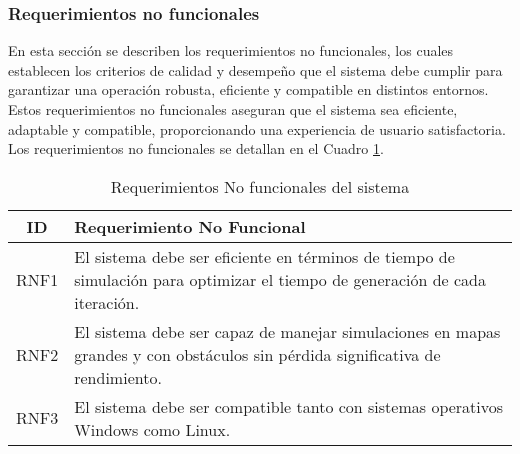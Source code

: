 \subsubsection{Requerimientos no funcionales}

    En esta secci\'on se describen los requerimientos no 
        funcionales, los cuales establecen los criterios de calidad y 
        desempe\~no que el sistema debe cumplir para garantizar una operaci\'on 
        robusta, eficiente y compatible en distintos entornos. Estos 
        requerimientos no funcionales aseguran que el sistema sea eficiente, 
        adaptable y compatible, proporcionando una experiencia de usuario 
        satisfactoria. Los requerimientos no funcionales se detallan en el Cuadro \ref{tab:requerimientos_no_funcionales}.
    \vskip 0.5cm
    \begin{table}[h!]
        \centering
        \begin{tabular}{|c|p{12cm}|}
        \hline
        \textbf{ID} & \textbf{Requerimiento No Funcional} \\
        \hline
        RNF1 & El sistema debe ser eficiente en t\'erminos de tiempo de simulaci\'on para optimizar el tiempo de generaci\'on de cada iteraci\'on. \\
        \hline
        RNF2 & El sistema debe ser capaz de manejar simulaciones en mapas grandes y con obst\'aculos sin p\'erdida significativa de rendimiento. \\
        \hline
        RNF3 & El sistema debe ser compatible tanto con sistemas operativos Windows como Linux. \\
        \hline
        \end{tabular}
        \caption{Requerimientos No funcionales del sistema}
        \label{tab:requerimientos_no_funcionales}
    \end{table}